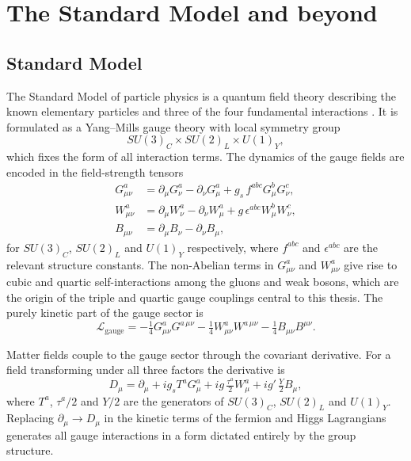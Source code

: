 \chapter{The Standard Model and beyond}
\label{chap:sm}

\section{Standard Model}

The Standard Model of particle physics is a quantum field theory describing the known elementary particles and three of the four fundamental interactions \cite{Thomson_ModernParticlePhysics_2013, Griffiths_IntroParticles_2008}. It is formulated as a Yang--Mills gauge theory \cite{YangMills_Symmetry_1954} with local symmetry group
\begin{equation}
SU(3)_{C}\times SU(2)_{L}\times U(1)_{Y},
\end{equation}
which fixes the form of all interaction terms. The dynamics of the gauge fields are encoded in the field-strength tensors
\begin{align}
G_{\mu\nu}^{a} &= \partial_{\mu}G_{\nu}^{a} - \partial_{\nu}G_{\mu}^{a} + g_{s}\,f^{abc}G_{\mu}^{b}G_{\nu}^{c}, \\ W_{\mu\nu}^{a} &= \partial_{\mu}W_{\nu}^{a} - \partial_{\nu}W_{\mu}^{a} + g\,\epsilon^{abc}W_{\mu}^{b}W_{\nu}^{c}, \\ B_{\mu\nu} &= \partial_{\mu}B_{\nu} - \partial_{\nu}B_{\mu},
\end{align}
for $SU(3)_{C}$, $SU(2)_{L}$ and $U(1)_{Y}$ respectively, where $f^{abc}$ and $\epsilon^{abc}$ are the relevant structure constants. The non-Abelian terms in $G_{\mu\nu}^{a}$ and $W_{\mu\nu}^{a}$ give rise to cubic and quartic self-interactions among the gluons and weak bosons, which are the origin of the triple and quartic gauge couplings central to this thesis. The purely kinetic part of the gauge sector is
\begin{equation}
\mathcal{L}_{\mathrm{gauge}} = -\tfrac{1}{4}G_{\mu\nu}^{a}G^{a\,\mu\nu} -\tfrac{1}{4}W_{\mu\nu}^{a}W^{a\,\mu\nu} -\tfrac{1}{4}B_{\mu\nu}B^{\mu\nu}.
\end{equation}

Matter fields couple to the gauge sector through the covariant derivative. For a field transforming under all three factors the derivative is
\begin{equation}
D_{\mu} = \partial_{\mu} + ig_{s}T^{a}G_{\mu}^{a} + ig\,\tfrac{\tau^{a}}{2}W_{\mu}^{a} + ig'\,\tfrac{Y}{2}B_{\mu},
\label{eq:covderiv}
\end{equation}
where $T^{a}$, $\tau^{a}/2$ and $Y/2$ are the generators of $SU(3)_{C}$, $SU(2)_{L}$ and $U(1)_{Y}$. Replacing $\partial_{\mu}\to D_{\mu}$ in the kinetic terms of the fermion and Higgs Lagrangians generates all gauge interactions in a form dictated entirely by the group structure.

